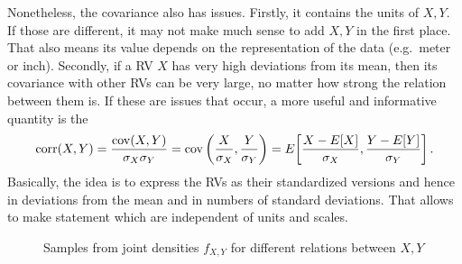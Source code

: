 Nonetheless, the covariance also has issues. Firstly, it contains the units of $X, Y$. If those are different, it may not make much sense to add $X, Y$ in the first place. That also means its value depends on the representation of the data (e.g.~meter or inch). Secondly, if a RV $X$ has very high deviations from its mean, then its covariance with other RVs can be very large, no matter how strong the relation between them is. If these are issues that occur, a more useful and informative quantity is the 
\begin{equation}
\operatorname{corr}(X, Y) = \frac{\operatorname{cov}(X, Y)}{\sigma_X \sigma_Y} = \operatorname{cov}\qty(\frac{X}{\sigma_X}, \frac{Y}{\sigma_Y}) = E\qty[\frac{X - E[X]}{\sigma_X}, \frac{Y - E[Y]}{\sigma_Y}] \, .
\end{equation}
Basically, the idea is to express the RVs as their standardized versions and hence in deviations from the mean and in numbers of standard deviations. That allows to make statement which are independent of units and scales.\\



\begin{figure}
\centering

\iffalse
{

\def\Square{(-2.5,-2.5) rectangle (2.5,2.5)}
\def\EllipseA{(0,0) ellipse [rotate=-45, x radius=0.8, y radius=2]}
\def\EllipseB{(0,0) ellipse [rotate=45, x radius=0.8, y radius=2]}


\subfloat[Uncorrelated ($\Cov(X, Y) = 0$)]{
\begin{tikzpicture}
\draw \Square;
\draw[pattern=north west lines, pattern color=black] circle(1.6);\Circle;
\end{tikzpicture}
}
%
\subfloat[Correlated ($\Cov(X, Y) > 0$)]{
\begin{tikzpicture}
\draw \Square;
\draw[pattern=north west lines, pattern color=black] \EllipseA;
\end{tikzpicture}
}
%
\subfloat[Anticorrelated ($\Cov(X, Y) < 0$)]{
\begin{tikzpicture}
\draw \Square;
\draw[pattern=north west lines, pattern color=black] \EllipseB;
\end{tikzpicture}
}

\caption{Schematic plot of joint densities $f_{X, Y}$ for different relations between $X, Y$}

}
\fi

%
%


\caption{Samples from joint densities $f_{X, Y}$ for different relations between $X, Y$}
\label{fig:correlations}
\end{figure}



